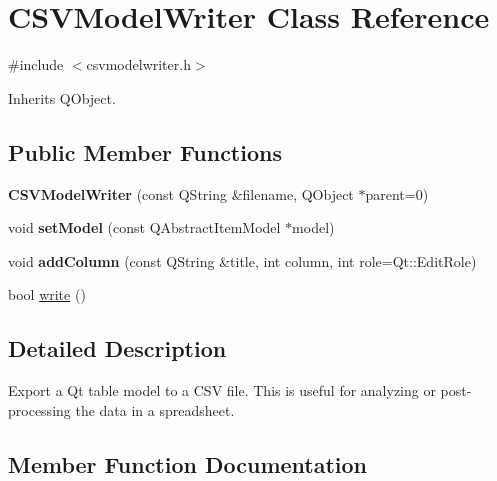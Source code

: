 \hypertarget{class_c_s_v_model_writer}{}\section{C\+S\+V\+Model\+Writer Class Reference}
\label{class_c_s_v_model_writer}


{\ttfamily \#include $<$csvmodelwriter.\+h$>$}



Inherits Q\+Object.

\subsection*{Public Member Functions}
\begin{DoxyCompactItemize}
\item 
\mbox{\label{class_c_s_v_model_writer_a343d5ebba512dea41a62e11e45a6d175}} 
{\bfseries C\+S\+V\+Model\+Writer} (const Q\+String \&filename, Q\+Object $\ast$parent=0)
\item 
\mbox{\label{class_c_s_v_model_writer_a7b8be6f49a66b965a94a89c78fb96e40}} 
void {\bfseries set\+Model} (const Q\+Abstract\+Item\+Model $\ast$model)
\item 
\mbox{\label{class_c_s_v_model_writer_a9e5f0d60f2c873747582ce21ddeb53b5}} 
void {\bfseries add\+Column} (const Q\+String \&title, int column, int role=Qt\+::\+Edit\+Role)
\item 
bool \mbox{\hyperlink{class_c_s_v_model_writer_a71fe52fdd6f41c506f9631175cb04615}{write}} ()
\end{DoxyCompactItemize}


\subsection{Detailed Description}
Export a Qt table model to a C\+SV file. This is useful for analyzing or post-\/processing the data in a spreadsheet. 

\subsection{Member Function Documentation}
\mbox{\label{class_c_s_v_model_writer_a71fe52fdd6f41c506f9631175cb04615}} 
